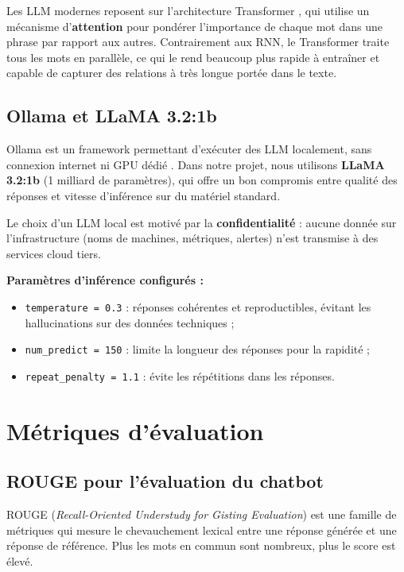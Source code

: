 Les LLM modernes reposent sur l'architecture Transformer \cite{vaswani2017attention},
qui utilise un mécanisme d'\textbf{attention} pour pondérer l'importance de chaque
mot dans une phrase par rapport aux autres. Contrairement aux RNN, le Transformer
traite tous les mots en parallèle, ce qui le rend beaucoup plus rapide à entraîner
et capable de capturer des relations à très longue portée dans le texte.

\subsection{Ollama et LLaMA 3.2:1b}

Ollama est un framework permettant d'exécuter des LLM localement, sans connexion
internet ni GPU dédié \cite{touvron2023llama}. Dans notre projet, nous utilisons
\textbf{LLaMA 3.2:1b} (1 milliard de paramètres), qui offre un bon compromis entre
qualité des réponses et vitesse d'inférence sur du matériel standard.

Le choix d'un LLM local est motivé par la \textbf{confidentialité} : aucune donnée
sur l'infrastructure (noms de machines, métriques, alertes) n'est transmise à des
services cloud tiers.

\textbf{Paramètres d'inférence configurés :}
\begin{itemize}
  \item \texttt{temperature = 0.3} : réponses cohérentes et reproductibles,
        évitant les hallucinations sur des données techniques ;
  \item \texttt{num\_predict = 150} : limite la longueur des réponses pour
        la rapidité ;
  \item \texttt{repeat\_penalty = 1.1} : évite les répétitions dans les réponses.
\end{itemize}

\section{Métriques d'évaluation}

\subsection{ROUGE pour l'évaluation du chatbot}

ROUGE (\textit{Recall-Oriented Understudy for Gisting Evaluation})
\cite{lin2004rouge} est une famille de métriques qui mesure le chevauchement
lexical entre une réponse générée et une réponse de référence. Plus les mots
en commun sont nombreux, plus le score est élevé.


